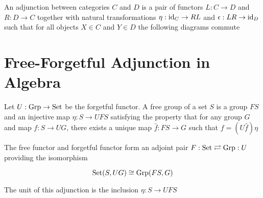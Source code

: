 \documentclass{article}
\begin{document}
\begin{definition}[adjunction]
    An adjunction between categories $C$ and $D$ is a pair of functors $L: C \to D$ and $R: D \to C$ together with natural transformations $\eta: \operatorname{id}_C \to RL$ and $\epsilon: LR \to \operatorname{id}_D$ such that for all objects $X \in C$ and $Y \in D$ the following diagrams commute
    \begin{center}
    \end{center}
\end{definition}


\section{Free-Forgetful Adjunction in Algebra}

\begin{example}
    Let $U: \operatorname{Grp} \to \operatorname{Set}$ be the forgetful functor. A free group of a set $S$ is a group $FS$ and an injective map $\eta: S \to UFS$ satisfying the property that for any group $G$ and map $f: S \to UG$, there exists a unique map $\hat{f}: FS \to G$ such that $f = (U\hat{f}) \eta$
    \begin{center}
    \end{center}

    The free functor and forgetful functor form an adjoint pair $F: \operatorname{Set} \rightleftarrows \operatorname{Grp}: U$ providing the isomorphism

    $$
        \operatorname{Set}(S, UG) \cong \operatorname{Grp}(FS, G)
    $$

    The unit of this adjunction is the inclusion $\eta: S \to UFS$
    
\end{example}
\end{document}
